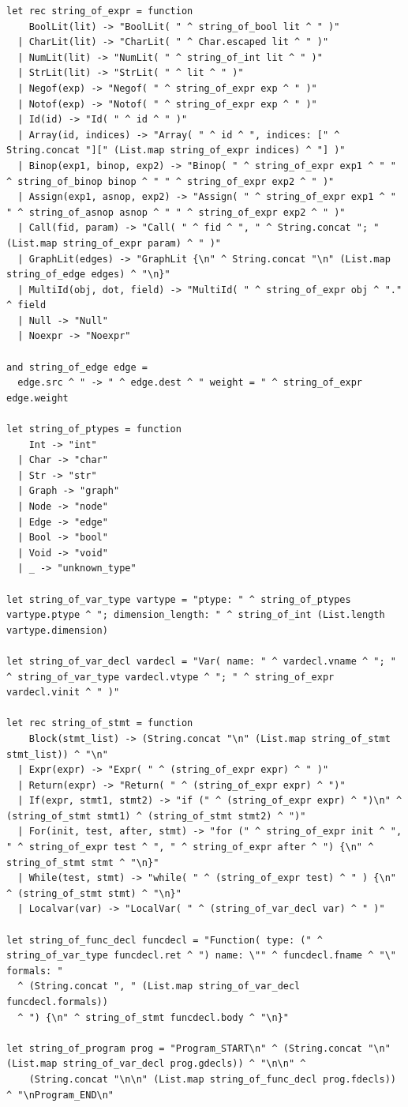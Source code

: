 \documentclass[a4paper,12pt]{article}
\begin{document}
\begin{lstlisting}
let rec string_of_expr = function
    BoolLit(lit) -> "BoolLit( " ^ string_of_bool lit ^ " )"
  | CharLit(lit) -> "CharLit( " ^ Char.escaped lit ^ " )"
  | NumLit(lit) -> "NumLit( " ^ string_of_int lit ^ " )"
  | StrLit(lit) -> "StrLit( " ^ lit ^ " )"
  | Negof(exp) -> "Negof( " ^ string_of_expr exp ^ " )"
  | Notof(exp) -> "Notof( " ^ string_of_expr exp ^ " )"
  | Id(id) -> "Id( " ^ id ^ " )"
  | Array(id, indices) -> "Array( " ^ id ^ ", indices: [" ^ String.concat "][" (List.map string_of_expr indices) ^ "] )" 
  | Binop(exp1, binop, exp2) -> "Binop( " ^ string_of_expr exp1 ^ " " ^ string_of_binop binop ^ " " ^ string_of_expr exp2 ^ " )"
  | Assign(exp1, asnop, exp2) -> "Assign( " ^ string_of_expr exp1 ^ " " ^ string_of_asnop asnop ^ " " ^ string_of_expr exp2 ^ " )" 
  | Call(fid, param) -> "Call( " ^ fid ^ ", " ^ String.concat "; " (List.map string_of_expr param) ^ " )"
  | GraphLit(edges) -> "GraphLit {\n" ^ String.concat "\n" (List.map string_of_edge edges) ^ "\n}"
  | MultiId(obj, dot, field) -> "MultiId( " ^ string_of_expr obj ^ "." ^ field
  | Null -> "Null"
  | Noexpr -> "Noexpr"

and string_of_edge edge =
  edge.src ^ " -> " ^ edge.dest ^ " weight = " ^ string_of_expr edge.weight

let string_of_ptypes = function
    Int -> "int"
  | Char -> "char"
  | Str -> "str"
  | Graph -> "graph"
  | Node -> "node"
  | Edge -> "edge"
  | Bool -> "bool"
  | Void -> "void"
  | _ -> "unknown_type"

let string_of_var_type vartype = "ptype: " ^ string_of_ptypes vartype.ptype ^ "; dimension_length: " ^ string_of_int (List.length vartype.dimension)

let string_of_var_decl vardecl = "Var( name: " ^ vardecl.vname ^ "; " ^ string_of_var_type vardecl.vtype ^ "; " ^ string_of_expr vardecl.vinit ^ " )"

let rec string_of_stmt = function
    Block(stmt_list) -> (String.concat "\n" (List.map string_of_stmt stmt_list)) ^ "\n"
  | Expr(expr) -> "Expr( " ^ (string_of_expr expr) ^ " )"
  | Return(expr) -> "Return( " ^ (string_of_expr expr) ^ ")"
  | If(expr, stmt1, stmt2) -> "if (" ^ (string_of_expr expr) ^ ")\n" ^ (string_of_stmt stmt1) ^ (string_of_stmt stmt2) ^ ")"
  | For(init, test, after, stmt) -> "for (" ^ string_of_expr init ^ ", " ^ string_of_expr test ^ ", " ^ string_of_expr after ^ ") {\n" ^ string_of_stmt stmt ^ "\n}"
  | While(test, stmt) -> "while( " ^ (string_of_expr test) ^ " ) {\n" ^ (string_of_stmt stmt) ^ "\n}"
  | Localvar(var) -> "LocalVar( " ^ (string_of_var_decl var) ^ " )"

let string_of_func_decl funcdecl = "Function( type: (" ^ string_of_var_type funcdecl.ret ^ ") name: \"" ^ funcdecl.fname ^ "\" formals: " 
  ^ (String.concat ", " (List.map string_of_var_decl funcdecl.formals))
  ^ ") {\n" ^ string_of_stmt funcdecl.body ^ "\n}"

let string_of_program prog = "Program_START\n" ^ (String.concat "\n" (List.map string_of_var_decl prog.gdecls)) ^ "\n\n" ^
	(String.concat "\n\n" (List.map string_of_func_decl prog.fdecls)) ^ "\nProgram_END\n"
\end{lstlisting}
\end{document}
